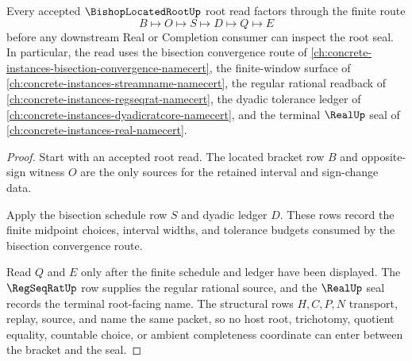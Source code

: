 \begin{theorem}
\label{thm:bishop-located-root-bisection-route}
Every accepted $\BishopLocatedRootUp$ root read factors through the finite route
$$
B \longmapsto O \longmapsto S \longmapsto D \longmapsto Q \longmapsto E
$$
before any downstream Real or Completion consumer can inspect the root seal. In particular, the read uses the bisection convergence route of \autoref{ch:concrete-instances-bisection-convergence-namecert}, the finite-window surface of \autoref{ch:concrete-instances-streamname-namecert}, the regular rational readback of \autoref{ch:concrete-instances-regseqrat-namecert}, the dyadic tolerance ledger of \autoref{ch:concrete-instances-dyadicratcore-namecert}, and the terminal $\RealUp$ seal of \autoref{ch:concrete-instances-real-namecert}.
\end{theorem}
\begin{proof}
Start with an accepted root read. The located bracket row $B$ and opposite-sign witness $O$ are the only sources for the retained interval and sign-change data.

Apply the bisection schedule row $S$ and dyadic ledger $D$. These rows record the finite midpoint choices, interval widths, and tolerance budgets consumed by the bisection convergence route.

Read $Q$ and $E$ only after the finite schedule and ledger have been displayed. The $\RegSeqRatUp$ row supplies the regular rational source, and the $\RealUp$ seal records the terminal root-facing name. The structural rows $H,C,P,N$ transport, replay, source, and name the same packet, so no host root, trichotomy, quotient equality, countable choice, or ambient completeness coordinate can enter between the bracket and the seal.
\end{proof}


\begin{closurestatus}{\BishopLocatedRootUp}
  \theoryclosure{\seedClosure}
  \formalstatus{\unformalizedV}
\end{closurestatus}
